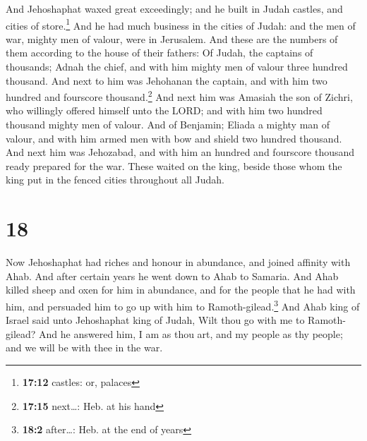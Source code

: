  And Jehoshaphat waxed great exceedingly; and he built in
Judah castles, and cities of store.\footnote{\textbf{17:12} castles: or,
  palaces}  And he had much business in the cities of
Judah: and the men of war, mighty men of valour, were in Jerusalem.
 And these are the numbers of them according to the house
of their fathers: Of Judah, the captains of thousands; Adnah the chief,
and with him mighty men of valour three hundred thousand.
 And next to him was Jehohanan the captain, and with him
two hundred and fourscore thousand.\footnote{\textbf{17:15} next\ldots:
  Heb. at his hand}  And next him was Amasiah the son of
Zichri, who willingly offered himself unto the LORD; and with him two
hundred thousand mighty men of valour.  And of Benjamin;
Eliada a mighty man of valour, and with him armed men with bow and
shield two hundred thousand.  And next him was Jehozabad,
and with him an hundred and fourscore thousand ready prepared for the
war.  These waited on the king, beside those whom the
king put in the fenced cities throughout all Judah.

\hypertarget{section-17}{%
\section{18}\label{section-17}}

 Now Jehoshaphat had riches and honour in abundance, and
joined affinity with Ahab.  And after certain years he
went down to Ahab to Samaria. And Ahab killed sheep and oxen for him in
abundance, and for the people that he had with him, and persuaded him to
go up with him to Ramoth-gilead.\footnote{\textbf{18:2} after\ldots:
  Heb. at the end of years}  And Ahab king of Israel said
unto Jehoshaphat king of Judah, Wilt thou go with me to Ramoth-gilead?
And he answered him, I am as thou art, and my people as thy people; and
we will be with thee in the war.

